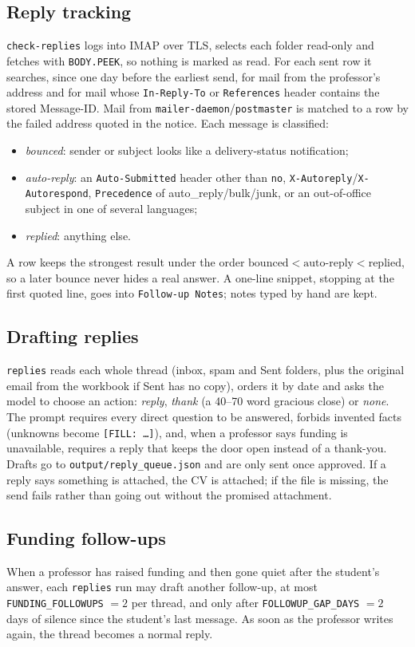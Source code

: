 \documentclass[11pt,a4paper]{article}
\newcommand{\code}[1]{\texttt{#1}}
\begin{document}
\subsection{Reply tracking}
\code{check-replies} logs into IMAP over TLS, selects each folder read-only and fetches with
\code{BODY.PEEK}, so nothing is marked as read. For each sent row it searches, since one day
before the earliest send, for mail from the professor's address and for mail whose
\code{In-Reply-To} or \code{References} header contains the stored Message-ID. Mail from
\code{mailer-daemon}/\code{postmaster} is matched to a row by the failed address quoted in the
notice. Each message is classified:
\begin{itemize}
  \item \emph{bounced}: sender or subject looks like a delivery-status notification;
  \item \emph{auto-reply}: an \code{Auto-Submitted} header other than \code{no},
        \code{X-Autoreply}/\code{X-Autorespond}, \code{Precedence} of auto\_reply/bulk/junk, or an
        out-of-office subject in one of several languages;
  \item \emph{replied}: anything else.
\end{itemize}
A row keeps the strongest result under the order $\text{bounced} < \text{auto-reply} <
\text{replied}$, so a later bounce never hides a real answer. A one-line snippet, stopping at the
first quoted line, goes into \code{Follow-up Notes}; notes typed by hand are kept.

\subsection{Drafting replies}
\code{replies} reads each whole thread (inbox, spam and Sent folders, plus the original email
from the workbook if Sent has no copy), orders it by date and asks the model to choose an action:
\emph{reply}, \emph{thank} (a 40--70 word gracious close) or \emph{none}. The prompt requires
every direct question to be answered, forbids invented facts (unknowns become
\code{[FILL: \ldots]}), and, when a professor says funding is unavailable, requires a reply that
keeps the door open instead of a thank-you. Drafts go to \code{output/reply\_queue.json} and are
only sent once approved. If a reply says something is attached, the CV is attached; if the file
is missing, the send fails rather than going out without the promised attachment.

\subsection{Funding follow-ups}
When a professor has raised funding and then gone quiet after the student's answer, each
\code{replies} run may draft another follow-up, at most \code{FUNDING\_FOLLOWUPS} $= 2$ per
thread, and only after \code{FOLLOWUP\_GAP\_DAYS} $= 2$ days of silence since the student's last
message. As soon as the professor writes again, the thread becomes a normal reply.
\end{document}
